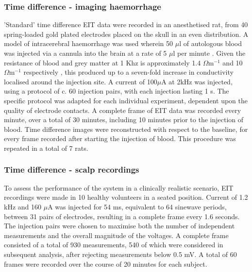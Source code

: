 \subsubsection{Time difference - imaging haemorrhage}
'Standard' time difference EIT data were recorded in an anesthetised rat, from 40 spring-loaded gold plated electrodes placed on the skull in an even distribution. A model of intracerebral haemorrhage was used wherein 50 $\mu$l of autologous blood was injected via a cannula into the brain at a rate of 5 $\mu$l per minute \cite{Dowrick_2016}. Given the resistance of blood and grey matter at 1 Khz is approximately 1.4 $\Omega {\text{m}}^{-1}$ and 10 $\Omega {\text{m}}^{-1}$ respectively \cite{Gabriel_2009}, this produced up to a seven-fold increase in conductivity localised around the injection site. A current of 100\( \mu \)A at 2kHz was injected, using a protocol of c. 60 injection pairs, with each injection lasting 1 s. The specific protocol was adapted for each individual experiment, dependent upon the quality of electrode contacts. A complete frame of EIT data was recorded every minute, over a total of 30 minutes, including 10 minutes prior to the injection of blood.  Time difference images were reconstructed with respect to the baseline, for every frame recorded after starting the injection of blood. This procedure was repeated in a total of 7 rats. 

\subsubsection{Time difference - scalp recordings}
\label{methodsTD}
To assess the performance of the system in a clinically realistic scenario, EIT recordings were made in 10 healthy volunteers in a seated position. Current of 1.2 kHz and 160 $\mu$A was injected for 54 ms, equivalent to 64 sinewave periods, between 31 pairs of electrodes, resulting in a complete frame every 1.6 seconds. The injection pairs were chosen to maximise both the number of independent measurements and the overall magnitude of the voltages\cite{Malone2014a}. A complete frame consisted of a total of 930 measurements, 540 of which were considered in subsequent analysis, after rejecting measurements below 0.5 mV. A total of 60 frames were recorded over the course of 20 minutes for each subject. 